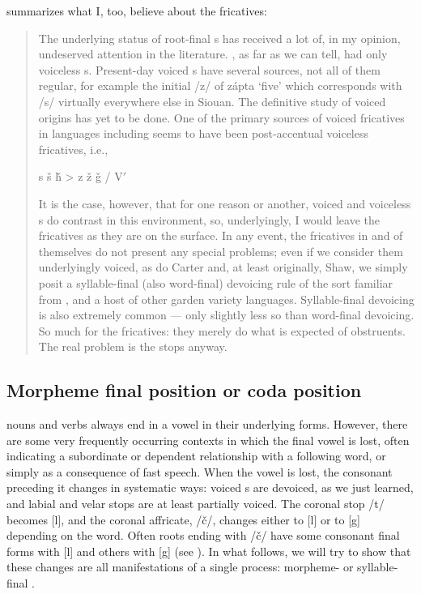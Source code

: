 \documentclass[output=paper]{LSP/langsci}
\begin{document}
\citet[4]{Rankin2001} summarizes what I, too, believe about the fricatives:

\begin{quote}The underlying status of  root-final s has received a lot of, in my opinion, undeserved attention in the literature. , as far as we can tell, had only voiceless s. Present-day voiced s have several sources, not all of them regular, for example the initial /z/ of z\'apta `five' which corresponds with /s/ virtually everywhere else in Siouan. The definitive study of voiced  origins has yet to be done. One of the primary sources of voiced fricatives in  languages including  seems to have been post-accentual voiceless fricatives, i.e.,\vspace{-1em}
\begin{center}
s \v{s} \v{h} > z \v{z} \v{g} / V$'$  \underline{\hspace{1em}}
\end{center}
\vspace{-1em}
It is the case, however, that for one reason or another, voiced and voiceless s do contrast in this environment, so, underlyingly, I would leave the fricatives as they are on the surface. In any event, the fricatives in and of themselves do not present any special problems; even if we consider them underlyingly voiced, as do Carter and, at least originally, Shaw, we simply posit a syllable-final (also word-final) devoicing rule of the sort familiar from ,  and a host of other garden variety languages. Syllable-final devoicing is also extremely common --- only slightly less so than word-final devoicing. So much for the fricatives: they merely do what is expected of obstruents. The real problem is the stops anyway.\end{quote}

\subsection{Morpheme final position or coda position}

 nouns and verbs always end in a vowel in their underlying forms. However, there are some very frequently occurring contexts in which the final vowel is lost, often indicating a subordinate or dependent relationship with a following word, or simply as a consequence of fast speech. When the vowel is lost, the consonant preceding it changes in systematic ways: voiced s are devoiced, as we just learned, and labial and velar stops are at least partially voiced. The coronal stop /t/ becomes [l], and the coronal affricate, /\v{c}/, changes either to [l] or to [g] depending on the word. Often roots ending with /\v{c}/ have some consonant final forms with [l] and others with [g] (see ). In what follows, we will try to show that these changes are all manifestations of a single process: morpheme- or syllable-final .
\end{document}
